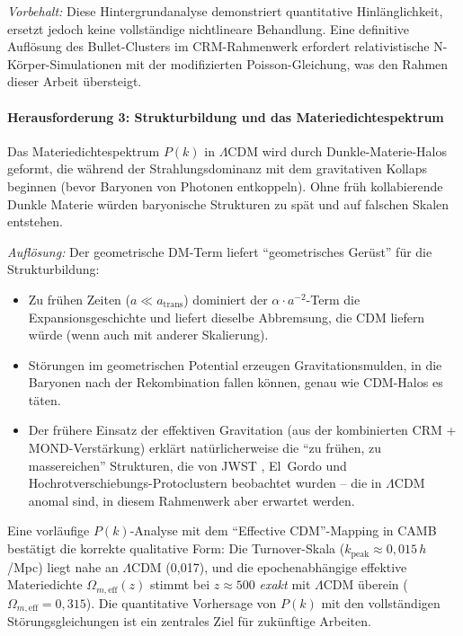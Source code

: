 \documentclass[aps,prd,twocolumn,superscriptaddress,nofootinbib]{revtex4-2}
\begin{document}
\textit{Vorbehalt:} Diese Hintergrundanalyse demonstriert quantitative Hinl\"anglichkeit, ersetzt jedoch keine vollst\"andige nichtlineare Behandlung. Eine definitive Aufl\"osung des Bullet-Clusters im CRM-Rahmenwerk erfordert relativistische N-K\"orper-Simulationen mit der modifizierten Poisson-Gleichung, was den Rahmen dieser Arbeit \"ubersteigt.

\paragraph{Herausforderung 3: Strukturbildung und das Materiedichtespektrum}

Das Materiedichtespektrum $P(k)$ in $\Lambda$CDM wird durch Dunkle-Materie-Halos geformt, die w\"ahrend der Strahlungsdominanz mit dem gravitativen Kollaps beginnen (bevor Baryonen von Photonen entkoppeln). Ohne fr\"uh kollabierende Dunkle Materie w\"urden baryonische Strukturen zu sp\"at und auf falschen Skalen entstehen.

\textit{Aufl\"osung:} Der geometrische DM-Term liefert "`geometrisches Ger\"ust"' f\"ur die Strukturbildung:
\begin{itemize}
\item Zu fr\"uhen Zeiten ($a \ll a_{\mathrm{trans}}$) dominiert der $\alpha \cdot a^{-2}$-Term die Expansionsgeschichte und liefert dieselbe Abbremsung, die CDM liefern w\"urde (wenn auch mit anderer Skalierung).
\item St\"orungen im geometrischen Potential erzeugen Gravitationsmulden, in die Baryonen nach der Rekombination fallen k\"onnen, genau wie CDM-Halos es t\"aten.
\item Der fr\"uhere Einsatz der effektiven Gravitation (aus der kombinierten CRM + MOND-Verst\"arkung) erkl\"art nat\"urlicherweise die "`zu fr\"uhen, zu massereichen"' Strukturen, die von JWST \cite{Labbe2023}, El~Gordo \cite{Asencio2023} und Hochrotverschiebungs-Protoclustern \cite{Miller2018} beobachtet wurden -- die in $\Lambda$CDM anomal sind, in diesem Rahmenwerk aber erwartet werden.
\end{itemize}

Eine vorl\"aufige $P(k)$-Analyse mit dem "`Effective CDM"'-Mapping in CAMB \cite{Lewis2000} best\"atigt die korrekte qualitative Form: Die Turnover-Skala ($k_{\mathrm{peak}} \approx 0{,}015$\,$h$/Mpc) liegt nahe an $\Lambda$CDM (0{,}017), und die epochenabh\"angige effektive Materiedichte $\Omega_{m,\mathrm{eff}}(z)$ stimmt bei $z \approx 500$ \textit{exakt} mit $\Lambda$CDM \"uberein ($\Omega_{m,\mathrm{eff}} = 0{,}315$). Die quantitative Vorhersage von $P(k)$ mit den vollst\"andigen St\"orungsgleichungen ist ein zentrales Ziel f\"ur zuk\"unftige Arbeiten.
\end{document}
